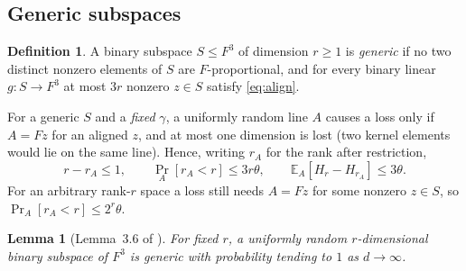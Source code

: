 \documentclass[11pt]{article}
\newtheorem{lemma}[theorem]{Lemma}
\theoremstyle{definition}
\newtheorem{definition}[theorem]{Definition}
\theoremstyle{remark}
\newcommand{\E}{\mathbb E}
\begin{document}
\subsection{Generic subspaces}

\begin{definition}
A binary subspace $S\le F^3$ of dimension $r\ge1$ is \emph{generic} if no two
distinct nonzero elements of $S$ are $F$-proportional, and for every binary
linear $g\colon S\to F^3$ at most $3r$ nonzero $z\in S$ satisfy
\eqref{eq:align}.
\end{definition}

For a generic $S$ and a \emph{fixed} $\gamma$, a uniformly random line $A$
causes a loss only if $A=Fz$ for an aligned $z$, and at most one dimension is
lost (two kernel elements would lie on the same line). Hence, writing $r_A$
for the rank after restriction,
\begin{equation}\label{eq:rank-loss}
r-r_A\le1,\qquad \Pr_A[r_A<r]\le3r\theta,\qquad \E_A[H_r-H_{r_A}]\le3\theta .
\end{equation}
For an arbitrary rank-$r$ space a loss still needs $A=Fz$ for some nonzero
$z\in S$, so $\Pr_A[r_A<r]\le2^r\theta$.

\begin{lemma}[Lemma~3.6 of \cite{OpenAI-UGC}]\label{lem:generic}
For fixed $r$, a uniformly random $r$-dimensional binary subspace of $F^3$ is
generic with probability tending to $1$ as $d\to\infty$.
\end{lemma}
\end{document}
